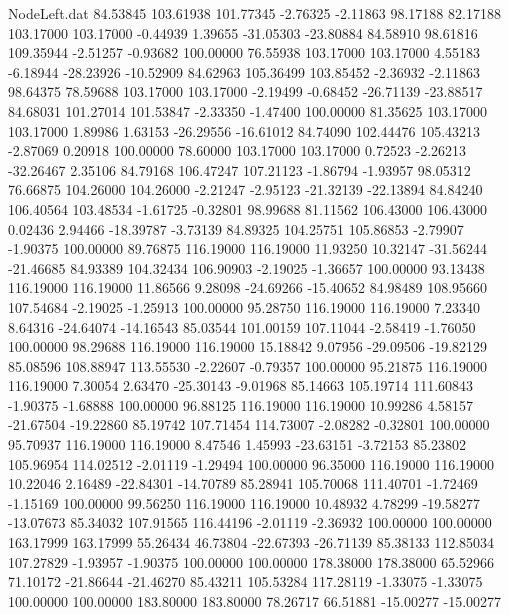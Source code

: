 \begin{filecontents}{NodeLeft.dat}
  84.53845  103.61938  101.77345    -2.76325   -2.11863   98.17188   82.17188  103.17000  103.17000   -0.44939    1.39655  -31.05303  -23.80884
  84.58910   98.61816  109.35944    -2.51257   -0.93682  100.00000   76.55938  103.17000  103.17000    4.55183   -6.18944  -28.23926  -10.52909
  84.62963  105.36499  103.85452    -2.36932   -2.11863   98.64375   78.59688  103.17000  103.17000   -2.19499   -0.68452  -26.71139  -23.88517
  84.68031  101.27014  101.53847    -2.33350   -1.47400  100.00000   81.35625  103.17000  103.17000    1.89986    1.63153  -26.29556  -16.61012
  84.74090  102.44476  105.43213    -2.87069    0.20918  100.00000   78.60000  103.17000  103.17000    0.72523   -2.26213  -32.26467    2.35106
  84.79168  106.47247  107.21123    -1.86794   -1.93957   98.05312   76.66875  104.26000  104.26000   -2.21247   -2.95123  -21.32139  -22.13894
  84.84240  106.40564  103.48534    -1.61725   -0.32801   98.99688   81.11562  106.43000  106.43000    0.02436    2.94466  -18.39787   -3.73139
  84.89325  104.25751  105.86853    -2.79907   -1.90375  100.00000   89.76875  116.19000  116.19000   11.93250   10.32147  -31.56244  -21.46685
  84.93389  104.32434  106.90903    -2.19025   -1.36657  100.00000   93.13438  116.19000  116.19000   11.86566    9.28098  -24.69266  -15.40652
  84.98489  108.95660  107.54684    -2.19025   -1.25913  100.00000   95.28750  116.19000  116.19000    7.23340    8.64316  -24.64074  -14.16543
  85.03544  101.00159  107.11044    -2.58419   -1.76050  100.00000   98.29688  116.19000  116.19000   15.18842    9.07956  -29.09506  -19.82129
  85.08596  108.88947  113.55530    -2.22607   -0.79357  100.00000   95.21875  116.19000  116.19000    7.30054    2.63470  -25.30143   -9.01968
  85.14663  105.19714  111.60843    -1.90375   -1.68888  100.00000   96.88125  116.19000  116.19000   10.99286    4.58157  -21.67504  -19.22860
  85.19742  107.71454  114.73007    -2.08282   -0.32801  100.00000   95.70937  116.19000  116.19000    8.47546    1.45993  -23.63151   -3.72153
  85.23802  105.96954  114.02512    -2.01119   -1.29494  100.00000   96.35000  116.19000  116.19000   10.22046    2.16489  -22.84301  -14.70789
  85.28941  105.70068  111.40701    -1.72469   -1.15169  100.00000   99.56250  116.19000  116.19000   10.48932    4.78299  -19.58277  -13.07673
  85.34032  107.91565  116.44196    -2.01119   -2.36932  100.00000  100.00000  163.17999  163.17999   55.26434   46.73804  -22.67393  -26.71139
  85.38133  112.85034  107.27829    -1.93957   -1.90375  100.00000  100.00000  178.38000  178.38000   65.52966   71.10172  -21.86644  -21.46270
  85.43211  105.53284  117.28119    -1.33075   -1.33075  100.00000  100.00000  183.80000  183.80000   78.26717   66.51881  -15.00277  -15.00277

\end{filecontents}
